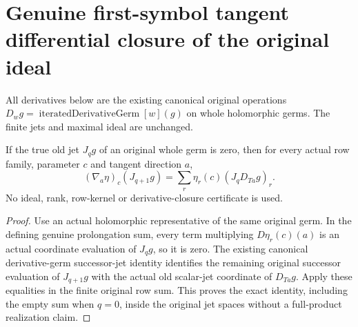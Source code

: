 \section{Genuine first-symbol tangent differential closure of the original ideal}

All derivatives below are the existing canonical original operations
$D_wg=\operatorname{iteratedDerivativeGerm}[w](g)$ on whole
holomorphic germs. The finite jets and maximal ideal are unchanged.

\begin{theorem}
\label{hir:actual-zero-old-jet-prolongation-derivative-pairing}
\leanok
If the true old jet $J_qg$ of an original whole germ is zero, then
for every actual row family, parameter $c$ and tangent direction $a$,
\[
 (\nabla_a\eta)_c(J_{q+1}g)
   =\sum_r\eta_r(c)(J_qD_{Ta}g)_r.
\]
No ideal, rank, row-kernel or derivative-closure certificate is used.
\end{theorem}
\begin{proof}
Use an actual holomorphic representative of the same original germ.
In the defining genuine prolongation sum, every term multiplying
$D\eta_r(c)(a)$ is an actual coordinate evaluation of $J_qg$,
so it is zero. The existing canonical derivative-germ successor-jet
identity identifies the remaining original successor evaluation of
$J_{q+1}g$ with the actual old scalar-jet coordinate of $D_{Ta}g$.
Apply these equalities in the finite original row sum. This proves
the exact identity, including the empty sum when $q=0$, inside the
original jet spaces without a full-product realization claim.
\end{proof}

